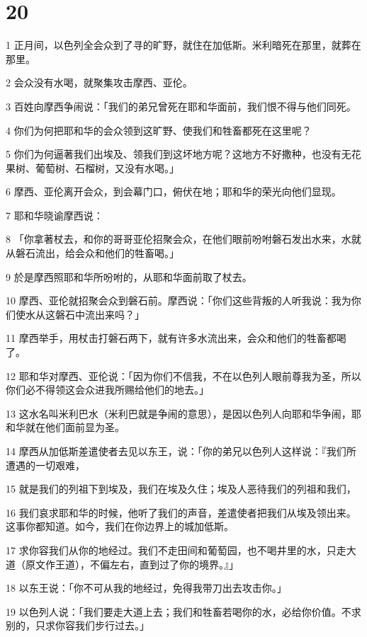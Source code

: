 \chapter{20}

\par 1 正月间，以色列全会众到了寻的旷野，就住在加低斯。米利暗死在那里，就葬在那里。
\par 2 会众没有水喝，就聚集攻击摩西、亚伦。
\par 3 百姓向摩西争闹说：「我们的弟兄曾死在耶和华面前，我们恨不得与他们同死。
\par 4 你们为何把耶和华的会众领到这旷野、使我们和牲畜都死在这里呢？
\par 5 你们为何逼著我们出埃及、领我们到这坏地方呢？这地方不好撒种，也没有无花果树、葡萄树、石榴树，又没有水喝。」
\par 6 摩西、亚伦离开会众，到会幕门口，俯伏在地；耶和华的荣光向他们显现。
\par 7 耶和华晓谕摩西说：
\par 8 「你拿著杖去，和你的哥哥亚伦招聚会众，在他们眼前吩咐磐石发出水来，水就从磐石流出，给会众和他们的牲畜喝。」
\par 9 於是摩西照耶和华所吩咐的，从耶和华面前取了杖去。
\par 10 摩西、亚伦就招聚会众到磐石前。摩西说：「你们这些背叛的人听我说：我为你们使水从这磐石中流出来吗？」
\par 11 摩西举手，用杖击打磐石两下，就有许多水流出来，会众和他们的牲畜都喝了。
\par 12 耶和华对摩西、亚伦说：「因为你们不信我，不在以色列人眼前尊我为圣，所以你们必不得领这会众进我所赐给他们的地去。」
\par 13 这水名叫米利巴水（米利巴就是争闹的意思），是因以色列人向耶和华争闹，耶和华就在他们面前显为圣。
\par 14 摩西从加低斯差遣使者去见以东王，说：「你的弟兄以色列人这样说：『我们所遭遇的一切艰难，
\par 15 就是我们的列祖下到埃及，我们在埃及久住；埃及人恶待我们的列祖和我们，
\par 16 我们哀求耶和华的时候，他听了我们的声音，差遣使者把我们从埃及领出来。这事你都知道。如今，我们在你边界上的城加低斯。
\par 17 求你容我们从你的地经过。我们不走田间和葡萄园，也不喝井里的水，只走大道（原文作王道），不偏左右，直到过了你的境界。』」
\par 18 以东王说：「你不可从我的地经过，免得我带刀出去攻击你。」
\par 19 以色列人说：「我们要走大道上去；我们和牲畜若喝你的水，必给你价值。不求别的，只求你容我们步行过去。」

